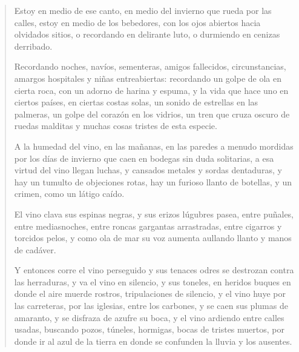 \documentclass[12pt]{article}
\begin{document}
\begin{verse}
Estoy en medio de ese canto, en medio
del invierno que rueda por las calles,
estoy en medio de los bebedores,
con los ojos abiertos hacia olvidados sitios,
o recordando en delirante luto,
o durmiendo en cenizas derribado.

Recordando noches, navíos, sementeras,
amigos fallecidos, circunstancias,
amargos hospitales y niñas entreabiertas:
recordando un golpe de ola en cierta roca,
con un adorno de harina y espuma,
y la vida que hace uno en ciertos países,
en ciertas costas solas,
un sonido de estrellas en las palmeras,
un golpe del corazón en los vidrios,
un tren que cruza oscuro de ruedas malditas
y muchas cosas tristes de esta especie.

A la humedad del vino, en las mañanas,
en las paredes a menudo mordidas por los días de invierno
que caen en bodegas sin duda solitarias,
a esa virtud del vino llegan luchas,
y cansados metales y sordas dentaduras,
y hay un tumulto de objeciones rotas,
hay un furioso llanto de botellas,
y un crimen, como un látigo caído.

El vino clava sus espinas negras,
y sus erizos lúgubres pasea,
entre puñales, entre mediasnoches,
entre roncas gargantas arrastradas,
entre cigarros y torcidos pelos,
y como ola de mar su voz aumenta
aullando llanto y manos de cadáver.

Y entonces corre el vino perseguido
y sus tenaces odres se destrozan
contra las herraduras, y va el vino en silencio,
y sus toneles, en heridos buques en donde el aire muerde
rostros, tripulaciones de silencio,
y el vino huye por las carreteras,
por las iglesias, entre los carbones,
y se caen sus plumas de amaranto,
y se disfraza de azufre su boca,
y el vino ardiendo entre calles usadas,
buscando pozos, túneles, hormigas,
bocas de tristes muertos,
por donde ir al azul de la tierra
en donde se confunden la lluvia y los ausentes.

\end{verse}
\end{document}
